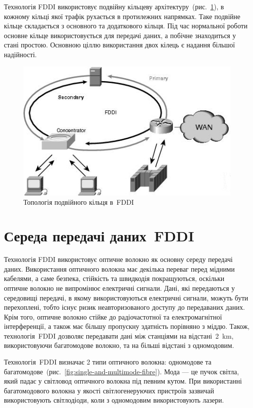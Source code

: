 \documentclass[
	a4paper,
	oneside,
	BCOR = 10mm,
	DIV = 12,
	12pt,
	headings = normal,
]{scrartcl}
\begin{document}
		Технологія \textenglish{FDDI} використовує подвійну кільцеву архітектуру~(рис.~\ref{fig:dual-ring-topology}), в кожному кільці якої трафік рухається в протилежних напрямках. Таке подвійне кільце складається з основного та додаткового кільця. Під час нормальної роботи основне кільце використовується для передачі даних, а побічне знаходиться у стані простою. Основною ціллю використання двох кілець є надання більшої надійності.

		\begin{figure}[!htbp]
			\centering
			\includegraphics[height = 8\baselineskip]{./assets/y03s01-telecom-homework-01-p01-fddi-counter-rotating.jpg}
			\caption{Топологія подвійного кільця в~\textenglish{FDDI}}
			\label{fig:dual-ring-topology}
		\end{figure}

	\section{Середа передачі даних~\textenglish{FDDI}}
		Технологія \textenglish{FDDI} використовує оптичне волокно як основну середу передачі даних. Використання оптичного волокна має декілька переваг перед мідними кабелями, а саме безпека, стійкість та швидкодія покращуються, оскільки оптичне волокно не випромінює електричні сигнали. Дані, які передаються у середовищі передачі, в якому використовуються електричні сигнали, можуть бути перехоплені, тобто існує ризик неавторизованого доступу до передаваних даних. Крім того, оптичне волокно стійке до радіочастотної та електромагнітної інтерференції, а також має більшу пропускну здатність порівняно з міддю. Також, технологія~\textenglish{FDDI} дозволяє передавати дані між станціями на відстані~\SI{2}{\kilo\metre}, використовуючи багатомодове волокно, та на більші відстані з одномодовим.

		Технологія~\textenglish{FDDI} визначає 2 типи оптичного волокна: одномодове та багатомодове~(рис.~\ref{fig:single-and-multimode-fibre}). Мода — це пучок світла, який падає у світловод оптичного волокна під певним кутом. При використанні багатомодового волокна у якості світлогенеруючих пристроїв зазвичай використовують світлодіоди, коли з одномодовим використовують лазери.
\end{document}
